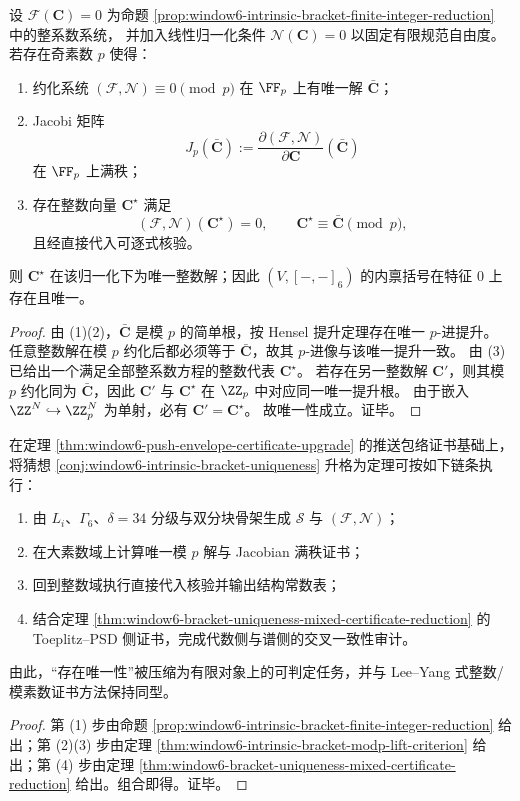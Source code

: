 \begin{theorem}\label{thm:window6-intrinsic-bracket-modp-lift-criterion}
设 \(\mathcal F(\mathbf C)=0\) 为命题
\ref{prop:window6-intrinsic-bracket-finite-integer-reduction}
中的整系数系统，
并加入线性归一化条件 \(\mathcal N(\mathbf C)=0\) 以固定有限规范自由度。
若存在奇素数 \(p\) 使得：
\begin{enumerate}
  \item 约化系统
  \(
  (\mathcal F,\mathcal N)\equiv 0\pmod p
  \)
  在 \(\FF_p\) 上有唯一解 \(\bar{\mathbf C}\)；
  \item Jacobi 矩阵
  \[
  J_p(\bar{\mathbf C})
  :=\frac{\partial(\mathcal F,\mathcal N)}{\partial\mathbf C}(\bar{\mathbf C})
  \]
  在 \(\FF_p\) 上满秩；
  \item 存在整数向量 \(\mathbf C^\star\) 满足
  \[
  (\mathcal F,\mathcal N)(\mathbf C^\star)=0,\qquad
  \mathbf C^\star\equiv \bar{\mathbf C}\pmod p,
  \]
  且经直接代入可逐式核验。
\end{enumerate}
则 \(\mathbf C^\star\) 在该归一化下为唯一整数解；因此
\((V,[-,-]_6)\) 的内禀括号在特征 \(0\) 上存在且唯一。
\end{theorem}
\begin{proof}
由 (1)(2)，\(\bar{\mathbf C}\) 是模 \(p\) 的简单根，按 Hensel 提升定理存在唯一 \(p\)-进提升。
任意整数解在模 \(p\) 约化后都必须等于 \(\bar{\mathbf C}\)，故其 \(p\)-进像与该唯一提升一致。
由 (3) 已给出一个满足全部整系数方程的整数代表 \(\mathbf C^\star\)。
若存在另一整数解 \(\mathbf C'\)，则其模 \(p\) 约化同为 \(\bar{\mathbf C}\)，因此 \(\mathbf C'\) 与 \(\mathbf C^\star\) 在 \(\ZZ_p\) 中对应同一唯一提升根。
由于嵌入 \(\ZZ^N\hookrightarrow \ZZ_p^N\) 为单射，必有 \(\mathbf C'=\mathbf C^\star\)。
故唯一性成立。证毕。
\end{proof}

\begin{corollary}[内禀括号定理化的可执行证书链]\label{cor:window6-intrinsic-bracket-theoremization-pipeline}
在定理 \ref{thm:window6-push-envelope-certificate-upgrade} 的推送包络证书基础上，
将猜想 \ref{conj:window6-intrinsic-bracket-uniqueness} 升格为定理可按如下链条执行：
\begin{enumerate}
  \item 由 \(L_i\)、\(\Gamma_6\)、\(\delta=34\) 分级与双分块骨架生成 \(\mathcal S\) 与 \((\mathcal F,\mathcal N)\)；
  \item 在大素数域上计算唯一模 \(p\) 解与 Jacobian 满秩证书；
  \item 回到整数域执行直接代入核验并输出结构常数表；
  \item 结合定理 \ref{thm:window6-bracket-uniqueness-mixed-certificate-reduction} 的 Toeplitz--PSD 侧证书，完成代数侧与谱侧的交叉一致性审计。
\end{enumerate}
由此，“存在唯一性”被压缩为有限对象上的可判定任务，并与 Lee--Yang 式整数/模素数证书方法保持同型。
\end{corollary}
\begin{proof}
第 (1) 步由命题
\ref{prop:window6-intrinsic-bracket-finite-integer-reduction}
给出；第 (2)(3) 步由定理
\ref{thm:window6-intrinsic-bracket-modp-lift-criterion}
给出；第 (4) 步由定理
\ref{thm:window6-bracket-uniqueness-mixed-certificate-reduction}
给出。组合即得。证毕。
\end{proof}

